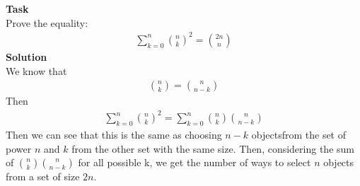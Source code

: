 \newpage		
	\section*{}
	\textbf{Task}\\
	Prove the equality:
	\begin{gather*}
		\sum\limits_{k=0}^{n} {{n}\choose{k}}^2 = {{2n}\choose{n}}
	\end{gather*}
	\textbf{Solution}\\
	We know that
	\begin{gather*}
		{{n}\choose{k}} = {{n}\choose{n-k}}
	\end{gather*}
	Then
	\begin{gather*}
		\sum\limits_{k=0}^{n} {{n}\choose{k}}^2 = 
		\sum\limits_{k=0}^{n} {{n}\choose{k}}{{n}\choose{n-k}}
	\end{gather*}
	Then we can see that this is the same as choosing $n-k$ objectsfrom the set of power $n$ and $k$ from the other set with the same size. Then, considering the sum of ${{n}\choose{k}}{{n}\choose{n-k}}$ for all possible k, we get the number of ways to select $n$ objects from a set of size $2n$. 